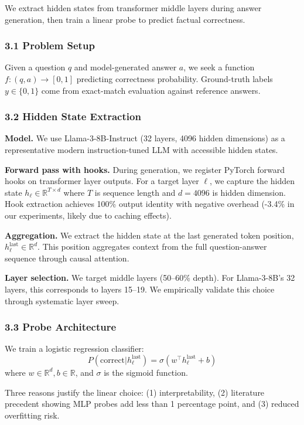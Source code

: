
We extract hidden states from transformer middle layers during answer generation, then train a linear probe to predict factual correctness.

\subsubsection{3.1 Problem Setup}

Given a question $q$ and model-generated answer $a$, we seek a function $f: (q, a) \rightarrow [0, 1]$ predicting correctness probability. Ground-truth labels $y \in \{0, 1\}$ come from exact-match evaluation against reference answers.

\subsubsection{3.2 Hidden State Extraction}

\textbf{Model.} We use Llama-3-8B-Instruct (32 layers, 4096 hidden dimensions) as a representative modern instruction-tuned LLM with accessible hidden states.

\textbf{Forward pass with hooks.} During generation, we register PyTorch forward hooks on transformer layer outputs. For a target layer $\ell$, we capture the hidden state $h_\ell \in \mathbb{R}^{T \times d}$ where $T$ is sequence length and $d = 4096$ is hidden dimension. Hook extraction achieves 100\% output identity with negative overhead (-3.4\% in our experiments, likely due to caching effects).

\textbf{Aggregation.} We extract the hidden state at the last generated token position, $h_\ell^{\text{last}} \in \mathbb{R}^d$. This position aggregates context from the full question-answer sequence through causal attention.

\textbf{Layer selection.} We target middle layers (50--60\% depth). For Llama-3-8B's 32 layers, this corresponds to layers 15--19. We empirically validate this choice through systematic layer sweep.

\subsubsection{3.3 Probe Architecture}

We train a logistic regression classifier:
$$P(\text{correct} | h_\ell^{\text{last}}) = \sigma(w^\top h_\ell^{\text{last}} + b)$$
where $w \in \mathbb{R}^d, b \in \mathbb{R}$, and $\sigma$ is the sigmoid function.

Three reasons justify the linear choice: (1) interpretability, (2) literature precedent showing MLP probes add less than 1 percentage point, and (3) reduced overfitting risk.

